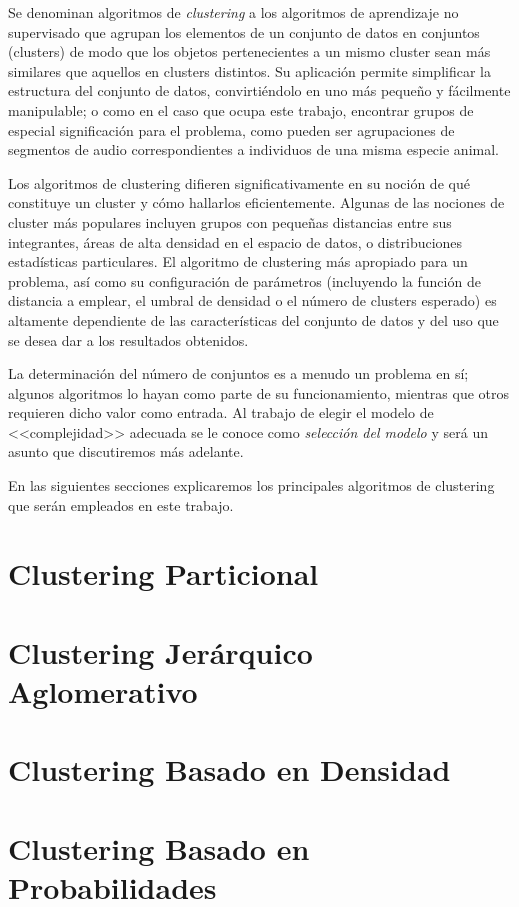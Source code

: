 Se denominan algoritmos de \textit{clustering} a los algoritmos de aprendizaje no supervisado que agrupan los elementos de un conjunto de datos en conjuntos (clusters) de modo que los objetos pertenecientes a un mismo cluster sean más similares que aquellos en clusters distintos.
Su aplicación permite simplificar la estructura del conjunto de datos, convirtiéndolo en uno más pequeño y fácilmente manipulable;
o como en el caso que ocupa este trabajo, encontrar grupos de especial significación para el problema, como pueden ser agrupaciones de segmentos de audio correspondientes a individuos de una misma especie animal.

Los algoritmos de clustering difieren significativamente en su noción de qué constituye un cluster y cómo hallarlos eficientemente.
Algunas de las nociones de cluster más populares incluyen grupos con pequeñas distancias entre sus integrantes, áreas de alta densidad en el espacio de datos, o distribuciones estadísticas particulares.
El algoritmo de clustering más apropiado para un problema, así como su configuración de parámetros (incluyendo la función de distancia a emplear, el umbral de densidad o el número de clusters esperado) es altamente dependiente de las características del conjunto de datos y del uso que se desea dar a los resultados obtenidos.

La determinación del número de conjuntos es a menudo un problema en sí;
algunos algoritmos lo hayan como parte de su funcionamiento, mientras que otros requieren dicho valor como entrada.
Al trabajo de elegir el modelo de <<complejidad>> adecuada se le conoce como \textit{selección del modelo} y será un asunto que discutiremos más adelante. %

En las siguientes secciones explicaremos los principales algoritmos de clustering que serán empleados en este trabajo.

\section{Clustering Particional}\label{sec:clusteringParticional}


\section{Clustering Jerárquico Aglomerativo}\label{sec:clusteringJerárquicoAglomerativo}


\section{Clustering Basado en Densidad}\label{sec:Dbscan}


\section{Clustering Basado en Probabilidades}\label{sec:clusteringBasadoEnProbabilidades}

